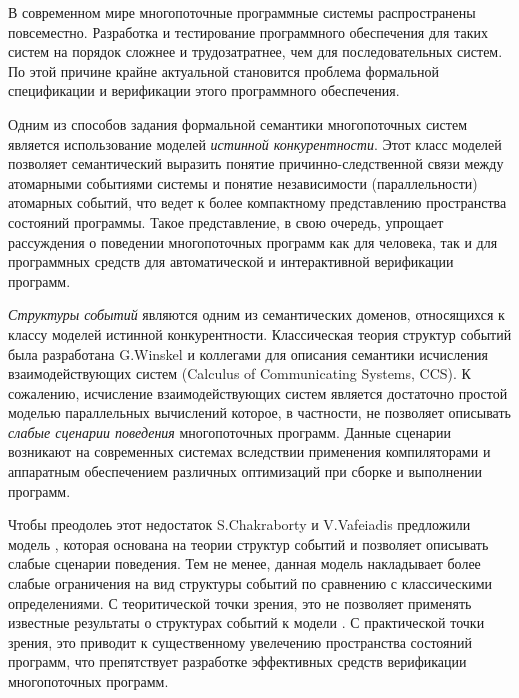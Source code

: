
{\actuality} 
В современном мире многопоточные программные системы распространены повсеместно. 
Разработка и тестирование программного обеспечения для таких систем на порядок 
сложнее и трудозатратнее, чем для последовательных систем. 
По этой причине крайне актуальной становится проблема 
формальной спецификации и верификации этого программного обеспечения. 

Одним из способов задания формальной семантики многопоточных систем 
является использование моделей \emph{истинной конкурентности}.
Этот класс моделей позволяет семантический выразить
понятие причинно-следственной связи между атомарными событиями системы
и понятие независимости (параллельности) атомарных событий,
что ведет к более компактному представлению пространства состояний программы.
Такое представление, в свою очередь, упрощает рассуждения 
о поведении многопоточных программ как для человека, 
так и для программных средств для автоматической и интерактивной верификации программ. 

\emph{Структуры событий} являются одним из семантических доменов, 
относящихся к классу моделей истинной конкурентности.
Классическая теория структур событий была разработана 
G.Winskel и коллегами для описания семантики 
исчисления взаимодействующих систем (Calculus of Communicating Systems, CCS).
К сожалению, исчисление взаимодействующих систем является 
достаточно простой моделью параллельных вычислений
которое, в частности, не позволяет описывать 
\emph{слабые сценарии поведения} многопоточных программ.
Данные сценарии возникают на современных системах вследствии 
применения компиляторами и аппаратным обеспечением
различных оптимизаций при сборке и выполнении программ. 

Чтобы преодолеь этот недостаток S.Chakraborty и V.Vafeiadis 
предложили модель \Wkm, которая основана на теории 
структур событий и позволяет описывать слабые сценарии поведения.
Тем не менее, данная модель накладывает более слабые ограничения 
на вид структуры событий по сравнению с классическими определениями. 
С теоритической точки зрения, это не позволяет 
применять известные результаты о структурах событий к модели \Wkm. 
С практической точки зрения, это приводит к существенному увелечению 
пространства состояний программ, что препятствует разработке эффективных 
средств верификации многопоточных программ.

